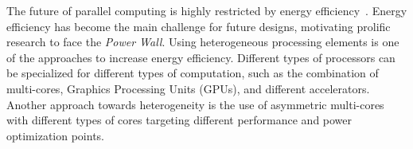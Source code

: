 


The future of parallel computing is highly restricted by energy efficiency~\cite{Kogge_Exascale_TR08}. Energy efficiency has become the main challenge for future designs, motivating prolific research to face the \emph{Power Wall}. Using heterogeneous processing elements is one of the approaches to increase energy efficiency. Different types of processors can be specialized for different types of computation, such as the combination of multi-cores, Graphics Processing Units (GPUs), and different accelerators. Another approach towards heterogeneity is the use of asymmetric multi-cores with different types of cores targeting different performance and power optimization points.

